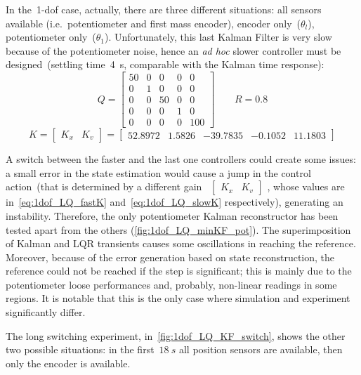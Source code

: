 In the~\acrshort{1-dof} case, actually, there are three different situations: all sensors available (i.e.~potentiometer and first mass encoder), encoder only~($\theta_l$), potentiometer only~($\theta_1$). Unfortunately, this last Kalman Filter is very slow because of the potentiometer noise, hence an \textit{ad hoc} slower controller must be designed~(settling time~4~s, comparable with the Kalman time response):
\[
	Q =
	\begin{bmatrix}
		50 & 0 & 0 & 0 & 0 \\
		0 & 1 & 0 & 0 & 0 \\
		0 & 0 & 50 & 0 & 0 \\
		0 & 0 & 0 & 1 & 0 \\
		0 & 0 & 0 & 0 & 100
	\end{bmatrix}
	\qquad
	R = 0.8
\]
\begin{equation}
	K =
	\left[
	\begin{array}{c|c}
		K_x & K_v
	\end{array}
	\right]
	=
	\left[
	\begin{array}{cccc|c}
		52.8972 & 1.5826 & -39.7835 & -0.1052 & 11.1803
	\end{array}
	\right]
	\label{eq:1dof_LQ_slowK}
\end{equation}

A switch between the faster and the last one controllers could create some issues: a small error in the state estimation would cause a jump in the control action~(that is determined by a different gain~
$
\left[
	\begin{array}{c|c}
		K_x & K_v
	\end{array}
\right]
$
, whose values are in~\cref{eq:1dof_LQ_fastK} and~\cref{eq:1dof_LQ_slowK} respectively), generating an instability. Therefore, the only potentiometer Kalman reconstructor has been tested apart from the others (\cref{fig:1dof_LQ_minKF_pot}). The superimposition of Kalman and LQR transients causes some oscillations in reaching the reference. Moreover, because of the error generation based on state reconstruction, the reference could not be reached if the step is significant; this is mainly due to the potentiometer loose performances and, probably, non-linear readings in some regions. It is notable that this is the only case where simulation and experiment significantly differ.

The long switching experiment, in~\cref{fig:1dof_LQ_KF_switch}, shows the other two possible situations: in the first~$18\ s$ all position sensors are available, then only the encoder is available.

